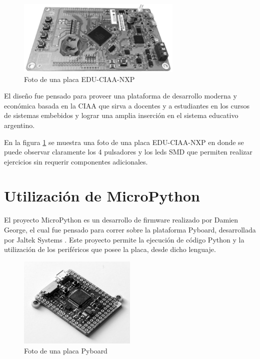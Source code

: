 \begin{figure}[ht]
  \centering
    \includegraphics[width=0.7\textwidth]{Figures/fig_educiaa_placa}
  \caption{Foto de una placa EDU-CIAA-NXP}
  \label{fig:educiaaPlaca}
\end{figure}

El diseño fue pensado para proveer una plataforma de desarrollo moderna y económica basada en la CIAA que sirva a docentes y a estudiantes en los cursos de sistemas embebidos y lograr una amplia inserción en el sistema educativo argentino.

En la figura \ref{fig:educiaaPlaca} se muestra una foto de una placa EDU-CIAA-NXP en donde se puede observar claramente los 4 pulsadores y los leds SMD que permiten realizar ejercicios sin requerir componentes adicionales.


\section{Utilización de MicroPython}
\label{sec:micropython}

El proyecto MicroPython \cite{micropython} es un desarrollo de firmware realizado por Damien George, el cual fue pensado para correr sobre la plataforma Pyboard, desarrollada por Jaltek Systems \cite{jaltek}. Este proyecto permite la ejecución de código Python y la utilización de los periféricos que posee la placa, desde dicho lenguaje.

\begin{figure}[ht]
  \centering
    \includegraphics[width=0.5\textwidth]{Figures/fig_pyboard}
  \caption{Foto de una placa Pyboard}
  \label{fig:pyboardPlaca}
\end{figure}

